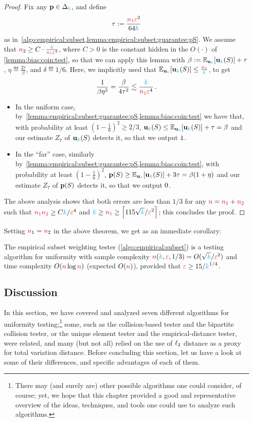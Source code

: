 \begin{proof}
Fix any $\p\in\distribs{\ab}$, and define 
\[
    \tau \eqdef \frac{\nss\dst^2}{64\ab}
\]
as in~\cref{algo:empirical:subset,lemma:empirical:subset:guarantee:pS}. We assume that $\ns_2 \geq C\cdot\frac{\ab}{\nss\dst^4}$, where $C>0$ is the constant hidden in the $O(\cdot)$ of \cref{lemma:bias:coin:test}, so that we can apply this lemma with $\beta \eqdef \bE{\uniform_\ab}{\uniform_\ab(S)} + \tau$, $\eta\eqdef \frac{2\tau}{\beta}$, and $\delta \eqdef 1/6$. Here, we implicitly used that
$
 \bE{\uniform_\ab}{\uniform_\ab(S)} \leq \frac{\nss}{\ab}
$,
to get
\[
    \frac{1}{\beta\eta^2} = \frac{\beta}{4\tau^2} \lesssim \frac{\ab}{\nss\dst^4}\,.
\]
\begin{itemize}
    \item In the uniform case, by~\cref{lemma:empirical:subset:guarantee:pS,lemma:bias:coin:test} we have that, with probability at least $(1-\frac{1}{6})^2 \geq 2/3$,
    $\uniform_\ab(S) \leq \bE{\uniform_\ab}{\uniform_\ab(S)} + \tau = \beta$ and our estimate $Z_7$ of  $\uniform_\ab(S)$ detects it, so that we output $\accept$. 
    \item In the ``far'' case, similarly by~\cref{lemma:empirical:subset:guarantee:pS,lemma:bias:coin:test}, with probability at least $(1-\frac{1}{6})^2$,
    $\p(S) \geq \bE{\uniform_\ab}{\uniform_\ab(S)} + 3\tau = \beta(1+\eta)$ and our estimate $Z_7$ of  $\p(S)$ detects it, so that we output $\reject$. 
\end{itemize}
  The above analysis shows that both errors are less than $1/3$ for any $\ns = \nss+\nst$ such that $\nss\nst \geq C\ab/\dst^4$ and $\ab\geq\nss \geq \clg{115\sqrt{\ab}/\dst^2}$; this concludes the proof.
\end{proof}
Setting $\ns_1=\ns_2$ in the above theorem, we get as an immediate corollary:
\begin{corollary}
  \label{coro:empirical-subset}
The empirical subset weighting tester (\cref{algo:empirical:subset}) is a testing algorithm for uniformity with sample complexity $\ns(\ab,\dst,1/3) = O(\sqrt{\ab}/\dst^2)$ and time complexity $O(\ns\log\ns)$ (expected $O(\ns)$), provided that $\dst \geq 15/\ab^{1/4}$.
\end{corollary}

\subsection{Discussion}
  \label{ssec:uniformity:discussion}
In this section, we have covered and analyzed seven different algorithms for uniformity testing;\footnote{There may (and surely are) other possible algorithms one could consider, of course; yet, we hope that this chapter provided a good and representative overview of the ideas, techniques, and tools one could use to analyze such algorithms.} some, such as the collision-based tester and the bipartite collision tester, or the unique element tester and the empirical-distance tester, were related, and many (but not all) relied on the use of $\lp[2]$ distance as a proxy for total variation distance. Before concluding this section, let us have a look at some of their differences, and specific advantages of each of them.


